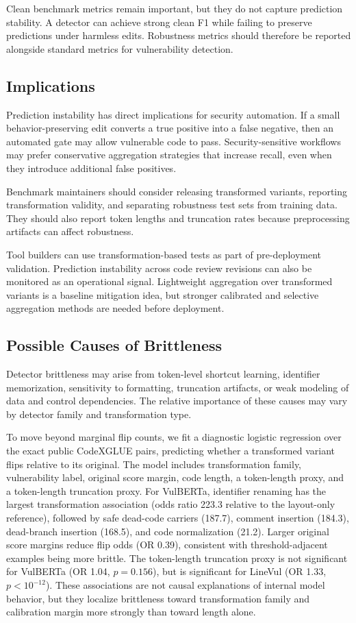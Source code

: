 \documentclass[a4paper,fleqn]{cas-dc}
\begin{document}
Clean benchmark metrics remain important, but they do not capture prediction
stability. A detector can achieve strong clean F1 while failing to preserve
predictions under harmless edits. Robustness metrics should therefore be
reported alongside standard metrics for vulnerability detection.

\subsection{Implications}

Prediction instability has direct implications for security automation. If a
small behavior-preserving edit converts a true positive into a false negative,
then an automated gate may allow vulnerable code to pass. Security-sensitive
workflows may prefer conservative aggregation strategies that increase recall,
even when they introduce additional false positives.

Benchmark maintainers should consider releasing transformed variants, reporting
transformation validity, and separating robustness test sets from training
data. They should also report token lengths and truncation rates because
preprocessing artifacts can affect robustness.

Tool builders can use transformation-based tests as part of pre-deployment
validation. Prediction instability across code review revisions can also be
monitored as an operational signal. Lightweight aggregation over transformed
variants is a baseline mitigation idea, but stronger calibrated and selective
aggregation methods are needed before deployment.

\subsection{Possible Causes of Brittleness}
\label{sec:mechanism-analysis}

Detector brittleness may arise from token-level shortcut learning, identifier
memorization, sensitivity to formatting, truncation artifacts, or weak modeling
of data and control dependencies. The relative importance of these causes may
vary by detector family and transformation type.

To move beyond marginal flip counts, we fit a diagnostic logistic regression
over the exact public CodeXGLUE pairs, predicting whether a transformed variant
flips relative to its original. The model includes transformation family,
vulnerability label, original score margin, code length, a token-length proxy,
and a token-length truncation proxy. For VulBERTa, identifier renaming has the
largest transformation association (odds ratio 223.3 relative to the
layout-only reference), followed by safe dead-code carriers (187.7), comment
insertion (184.3), dead-branch insertion (168.5), and code normalization
(21.2). Larger original score margins reduce flip odds (OR 0.39), consistent
with threshold-adjacent examples being more brittle. The token-length
truncation proxy is not significant for VulBERTa (OR 1.04, $p=0.156$), but is
significant for LineVul (OR 1.33, $p<10^{-12}$). These associations are not
causal explanations of internal model behavior, but they localize brittleness
toward transformation family and calibration margin more strongly than toward
length alone.
\end{document}
